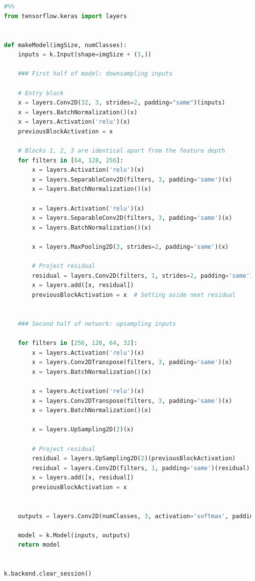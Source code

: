 \begin{lstlisting}[language=python]
    

#%% 
from tensorflow.keras import layers


def makeModel(imgSize, numClasses):
    inputs = k.Input(shape=imgSize + (3,))

    ### First half of model: downsampling inputs

    # Entry block
    x = layers.Conv2D(32, 3, strides=2, padding="same")(inputs)
    x = layers.BatchNormalization()(x)
    x = layers.Activation('relu')(x)
    previousBlockActivation = x

    # Blocks 1, 2, 3 are identical apart from the feature depth
    for filters in [64, 128, 256]:
        x = layers.Activation('relu')(x)
        x = layers.SeparableConv2D(filters, 3, padding='same')(x)
        x = layers.BatchNormalization()(x)
        
        x = layers.Activation('relu')(x)
        x = layers.SeparableConv2D(filters, 3, padding='same')(x)
        x = layers.BatchNormalization()(x)

        x = layers.MaxPooling2D(3, strides=2, padding='same')(x)

        # Project residual
        residual = layers.Conv2D(filters, 1, strides=2, padding='same')(previousBlockActivation)
        x = layers.add([x, residual])
        previousBlockActivation = x  # Setting aside next residual


    ### Second half of network: upsampling inputs

    for filters in [256, 128, 64, 32]:
        x = layers.Activation('relu')(x)
        x = layers.Conv2DTranspose(filters, 3, padding='same')(x)
        x = layers.BatchNormalization()(x)

        x = layers.Activation('relu')(x)
        x = layers.Conv2DTranspose(filters, 3, padding='same')(x)
        x = layers.BatchNormalization()(x)

        x = layers.UpSampling2D(2)(x)

        # Project residual
        residual = layers.UpSampling2D(2)(previousBlockActivation)
        residual = layers.Conv2D(filters, 1, padding='same')(residual)
        x = layers.add([x, residual])
        previousBlockActivation = x

    
    outputs = layers.Conv2D(numClasses, 3, activation='softmax', padding='same')(x)

    model = k.Model(inputs, outputs)
    return model


k.backend.clear_session()


\end{lstlisting}
